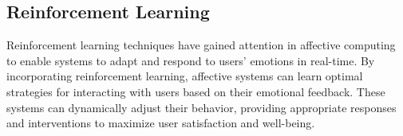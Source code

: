 \subsection{Reinforcement Learning}

Reinforcement learning techniques have gained attention in affective computing to enable systems to adapt and respond to users' emotions in real-time. 
By incorporating reinforcement learning, affective systems can learn optimal strategies for interacting with users based on their emotional feedback.
 These systems can dynamically adjust their behavior, providing appropriate responses and interventions to maximize user satisfaction and well-being.